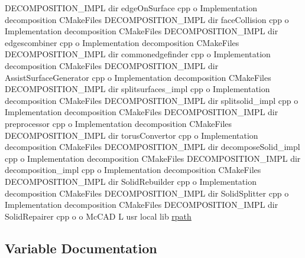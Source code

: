\begin{DoxyCompactItemize}
D\+E\+C\+O\+M\+P\+O\+S\+I\+T\+I\+O\+N\+\_\+\+I\+M\+PL dir edge\+On\+Surface cpp o Implementation decomposition C\+Make\+Files D\+E\+C\+O\+M\+P\+O\+S\+I\+T\+I\+O\+N\+\_\+\+I\+M\+PL dir face\+Collision cpp o Implementation decomposition C\+Make\+Files D\+E\+C\+O\+M\+P\+O\+S\+I\+T\+I\+O\+N\+\_\+\+I\+M\+PL dir edgescombiner cpp o Implementation decomposition C\+Make\+Files D\+E\+C\+O\+M\+P\+O\+S\+I\+T\+I\+O\+N\+\_\+\+I\+M\+PL dir commonedgefinder cpp o Implementation decomposition C\+Make\+Files D\+E\+C\+O\+M\+P\+O\+S\+I\+T\+I\+O\+N\+\_\+\+I\+M\+PL dir Assist\+Surface\+Generator cpp o Implementation decomposition C\+Make\+Files D\+E\+C\+O\+M\+P\+O\+S\+I\+T\+I\+O\+N\+\_\+\+I\+M\+PL dir splitsurfaces\+\_\+impl cpp o Implementation decomposition C\+Make\+Files D\+E\+C\+O\+M\+P\+O\+S\+I\+T\+I\+O\+N\+\_\+\+I\+M\+PL dir splitsolid\+\_\+impl cpp o Implementation decomposition C\+Make\+Files D\+E\+C\+O\+M\+P\+O\+S\+I\+T\+I\+O\+N\+\_\+\+I\+M\+PL dir preprocessor cpp o Implementation decomposition C\+Make\+Files D\+E\+C\+O\+M\+P\+O\+S\+I\+T\+I\+O\+N\+\_\+\+I\+M\+PL dir torus\+Convertor cpp o Implementation decomposition C\+Make\+Files D\+E\+C\+O\+M\+P\+O\+S\+I\+T\+I\+O\+N\+\_\+\+I\+M\+PL dir decompose\+Solid\+\_\+impl cpp o Implementation decomposition C\+Make\+Files D\+E\+C\+O\+M\+P\+O\+S\+I\+T\+I\+O\+N\+\_\+\+I\+M\+PL dir decomposition\+\_\+impl cpp o Implementation decomposition C\+Make\+Files D\+E\+C\+O\+M\+P\+O\+S\+I\+T\+I\+O\+N\+\_\+\+I\+M\+PL dir Solid\+Rebuilder cpp o Implementation decomposition C\+Make\+Files D\+E\+C\+O\+M\+P\+O\+S\+I\+T\+I\+O\+N\+\_\+\+I\+M\+PL dir Solid\+Splitter cpp o Implementation decomposition C\+Make\+Files D\+E\+C\+O\+M\+P\+O\+S\+I\+T\+I\+O\+N\+\_\+\+I\+M\+PL dir Solid\+Repairer cpp o o Mc\+C\+AD L usr local lib \hyperlink{link_8txt_a9153096a8d592d99bea019f5e75640ad}{rpath}
\end{DoxyCompactItemize}


\subsection{Variable Documentation}
\mbox{\label{link_8txt_a9153096a8d592d99bea019f5e75640ad}} 

